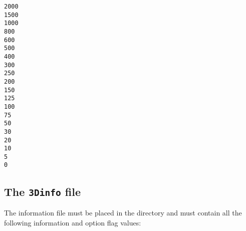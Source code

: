 \begin{center}
\begin{exfile}[H] %
\begin{footnotesize}
\begin{verbatim}
2000
1500
1000
800
600
500
400
300
250
200
150
125
100
75
50
30
20
10
5
0
\end{verbatim}
\end{footnotesize}
\caption{}
\label{contdepthfile}
\end{exfile}

\end{center}




\subsection{The \texttt{3Dinfo} file \label{sec:3Dinfo}}

The information file  must be placed in the  directory and must contain all the following information and option flag values:


